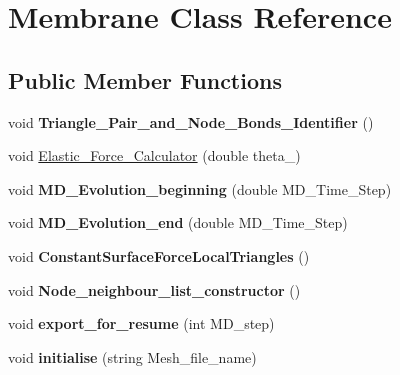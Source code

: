 \hypertarget{classMembrane}{}\section{Membrane Class Reference}
\label{classMembrane}
\subsection*{Public Member Functions}
\begin{DoxyCompactItemize}
\item 
void {\bfseries Triangle\+\_\+\+Pair\+\_\+and\+\_\+\+Node\+\_\+\+Bonds\+\_\+\+Identifier} ()\hypertarget{classMembrane_ad34ca5376368cc72a38b64ed6b0dd386}{}\label{classMembrane_ad34ca5376368cc72a38b64ed6b0dd386}

\item 
void \hyperlink{classMembrane_aff8b24e17a5e51e8e00f1c1780694d1f}{Elastic\+\_\+\+Force\+\_\+\+Calculator} (double theta\+\_)
\item 
void {\bfseries M\+D\+\_\+\+Evolution\+\_\+beginning} (double M\+D\+\_\+\+Time\+\_\+\+Step)\hypertarget{classMembrane_a718a254c0f843b06e07d0aad8451b652}{}\label{classMembrane_a718a254c0f843b06e07d0aad8451b652}

\item 
void {\bfseries M\+D\+\_\+\+Evolution\+\_\+end} (double M\+D\+\_\+\+Time\+\_\+\+Step)\hypertarget{classMembrane_a5292913dd4500db14e26147920a21e58}{}\label{classMembrane_a5292913dd4500db14e26147920a21e58}

\item 
void {\bfseries Constant\+Surface\+Force\+Local\+Triangles} ()\hypertarget{classMembrane_afeb736c81896f74f23e44ceaaa0d1e04}{}\label{classMembrane_afeb736c81896f74f23e44ceaaa0d1e04}

\item 
void {\bfseries Node\+\_\+neighbour\+\_\+list\+\_\+constructor} ()\hypertarget{classMembrane_aca9785ad0ab2514006a46c0c9bd8cf5c}{}\label{classMembrane_aca9785ad0ab2514006a46c0c9bd8cf5c}

\item 
void {\bfseries export\+\_\+for\+\_\+resume} (int M\+D\+\_\+step)\hypertarget{classMembrane_a45aaa9c0cbd3d22aa9b03e24480b69de}{}\label{classMembrane_a45aaa9c0cbd3d22aa9b03e24480b69de}

\item 
void {\bfseries initialise} (string Mesh\+\_\+file\+\_\+name)\hypertarget{classMembrane_a3353b57d3d0ca9f1d32ec3edea9e2f01}{}\label{classMembrane_a3353b57d3d0ca9f1d32ec3edea9e2f01}


\end{DoxyCompactItemize}
